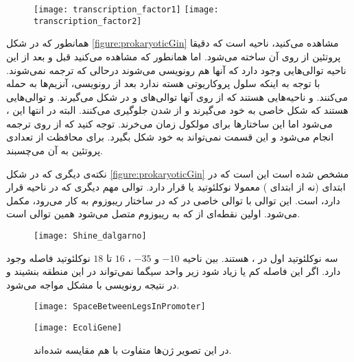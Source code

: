 \begin{figure}[htbp]
\centering
\texttt{[image: transcription\_factor1]}
\texttt{[image: transcription\_factor2]}
\end{figure}

همانطور که در شکل
\ref{figure:prokaryoticGin}
مشاهده می‌کنید،
ناحیه است که دقیقا پروتئین از روی آن ساخته می‌شود. اما همانطور که مشاهده می‌کنید قبل و بعد از این ناحیه توالی‌هایی وجود دارد که آنها هم رونویسی می‌شوند درحالی که ترجمه نمی‌شوند. با توجه به اینکه سلول پروکاریوتی هسته ندارد بعد از رونویسی، آنزیم‌ها به
حمله می‌کنند.
و
ناحیه‌هایی هستند که از روی آنها
توالی‌های
و
در
شکل می‌گیرند.
و
توالی‌هایی هستند که شکل خاصی به خود می‌گیرند و از
شدن
جلوگیری می‌کنند.
البته در انتها این
،
می‌شود اما این ساختار‌ها برای مولکول زمان می‌خرند.
توجه کنید که از روی
ترجمه انجام ‌می‌شود و این قسمت نمی‌تواند به خود شکل بگیرد. برای محافظت از
تعدادی پروتئین به آن می‌چسبند.

نکته‌ی دیگری که در شکل
\ref{figure:prokaryoticGin}
مشخص شده است این است که در ابتدای
(نه از ابتدای
)
معمولا نوکلئوتید
یا
قرار دارد.
توالی مهم دیگری که در ناحیه
قرار دارد،
است. این توالی با توالی خاصی در
که در ساختار ریبوزوم به کار می‌رود، مکمل می‌شود. اولین نقطه‌ای از
که به ریبوزوم متصل می‌شود همین توالی است.
\begin{figure}[htbp]
\centering
\texttt{[image: Shine\_dalgarno]}
\end{figure}

\noindent
سه نوکلئوتید اول در
،
هستند.
بین ناحیه
$ -10 $
و
$ -35 $
،
$ 16 $
تا
$18$
نوکلئوتید فاصله وجود دارد. اگر این فاصله کم یا زیاد شود زیر واحد سیگما نمی‌تواند در این منطقه بنشیند و در نتیجه رونویسی با مشکل مواجه می‌شود.

\begin{figure}[htbp]
\centering
\texttt{[image: SpaceBetweenLegsInPromoter]}
\end{figure}

\begin{figure}[htbp]
\centering
\texttt{[image: EcoliGene]}
\caption{در این تصویر ژن‌ها متفاوت 
با هم مقایسه شده‌اند.}
\end{figure}

\pagebreak
